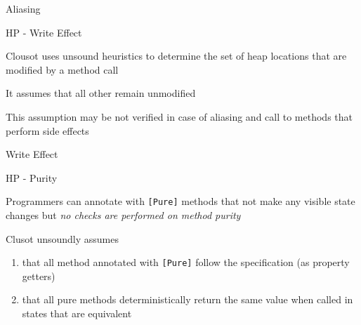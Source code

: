 \begin{frame}[fragile]{Aliasing}
\vspace*{-0.4cm}
\only<1>{}
\end{frame}


\begin{frame}{HP - Write Effect}

\vspace*{-0.6cm}

Clousot uses unsound heuristics to determine the set of heap locations that are
modified by a method call

\vspace*{0.6cm}

It assumes that all other remain unmodified

\vspace*{0.6cm}

This assumption may be not verified in case of aliasing and call to methods
that perform side effects

\end{frame}

\begin{frame}[fragile]{Write Effect}
\vspace*{-0.4cm}
\only<1>{}
\end{frame}


\begin{frame}{HP - Purity}

\vspace*{-0.4cm}

Programmers can annotate with \texttt{[Pure]} methods that not make any visible
state changes but \emph{no checks are performed on method purity}

\vspace*{0.6cm}

Clusot unsoundly assumes
\begin{enumerate}
  \item that all method annotated with \texttt{[Pure]} follow the
  specification (as property getters)
  \item that all pure methods deterministically return the same value when
  called in states that are equivalent
\end{enumerate}

\end{frame}


